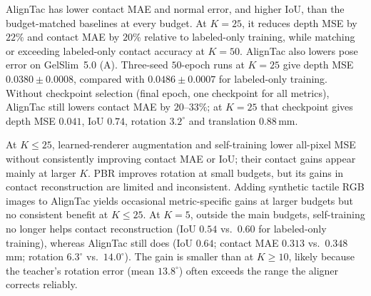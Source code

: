 AlignTac has lower contact MAE and normal error, and higher IoU, than the budget-matched baselines at every budget. At $K=25$, it reduces depth MSE by $22\%$ and contact MAE by $20\%$ relative to labeled-only training, while matching or exceeding labeled-only contact accuracy at $K=50$. AlignTac also lowers pose error on GelSlim~5.0 (A). Three-seed $50$-epoch runs at $K=25$ give depth MSE $0.0380\pm0.0008$, compared with $0.0486\pm0.0007$ for labeled-only training. Without checkpoint selection (final epoch, one checkpoint for all metrics), AlignTac still lowers contact MAE by $20$--$33\%$; at $K=25$ that checkpoint gives depth MSE $0.041$, IoU $0.74$, rotation $3.2^\circ$ and translation $0.88\,$mm.

At $K\le25$, learned-renderer augmentation and self-training lower all-pixel MSE without consistently improving contact MAE or IoU; their contact gains appear mainly at larger $K$. PBR improves rotation at small budgets, but its gains in contact reconstruction are limited and inconsistent. Adding synthetic tactile RGB images to AlignTac yields occasional metric-specific gains at larger budgets but no consistent benefit at $K\le25$. At $K=5$, outside the main budgets, self-training no longer helps contact reconstruction (IoU $0.54$ vs.\ $0.60$ for labeled-only training), whereas AlignTac still does (IoU $0.64$; contact MAE $0.313$ vs.\ $0.348\,$mm; rotation $6.3^\circ$ vs.\ $14.0^\circ$). The gain is smaller than at $K\ge10$, likely because the teacher's rotation error (mean $13.8^\circ$) often exceeds the range the aligner corrects reliably.

